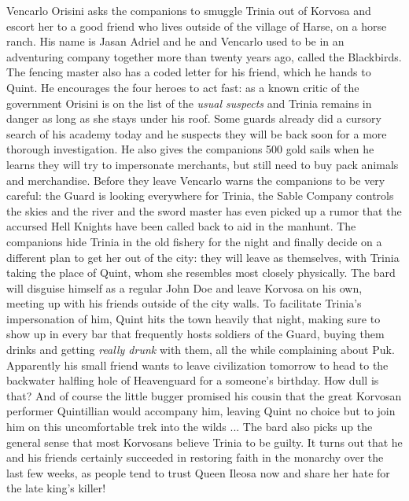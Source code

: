 Vencarlo Orisini asks the companions to smuggle Trinia out of Korvosa and escort her to a good friend who lives outside of the village of Harse, on a horse ranch. His name is Jasan Adriel and he and Vencarlo used to be in an adventuring company together more than twenty years ago, called the Blackbirds. The fencing master also has a coded letter for his friend, which he hands to Quint. He encourages the four heroes to act fast: as a known critic of the government Orisini is on the list of the {\itshape usual suspects} and Trinia remains in danger as long as she stays under his roof. Some guards already did a cursory search of his academy today and he suspects they will be back soon for a more thorough investigation. He also gives the companions 500 gold sails when he learns they will try to impersonate merchants, but still need to buy pack animals and merchandise. Before they leave Vencarlo warns the companions to be very careful: the Guard is looking everywhere for Trinia, the Sable Company controls the skies and the river and the sword master has even picked up a rumor that the accursed Hell Knights have been called back to aid in the manhunt. The companions hide Trinia in the old fishery for the night and finally decide on a different plan to get her out of the city: they will leave as themselves, with Trinia taking the place of Quint, whom she resembles most closely physically. The bard will disguise himself as a regular John Doe and leave Korvosa on his own, meeting up with his friends outside of the city walls. To facilitate Trinia's impersonation of him, Quint hits the town heavily that night, making sure to show up in every bar that frequently hosts soldiers of the Guard, buying them drinks and getting {\itshape really drunk} with them, all the while complaining about Puk. Apparently his small friend wants to leave civilization tomorrow to head to the backwater halfling hole of Heavenguard for a someone's birthday. How dull is that? And of course the little bugger promised his cousin that the great Korvosan performer Quintillian would accompany him, leaving Quint no choice but to join him on this uncomfortable trek into the wilds ... The bard also picks up the general sense that most Korvosans believe Trinia to be guilty. It turns out that he and his friends certainly succeeded in restoring faith in the monarchy over the last few weeks, as people tend to trust Queen Ileosa now and share her hate for the late king's killer! 